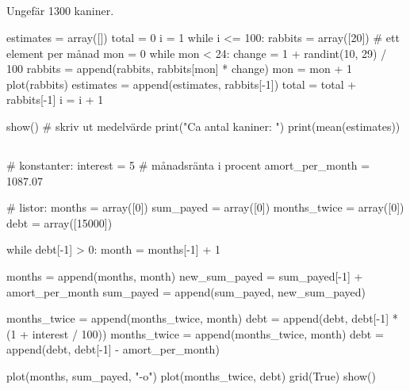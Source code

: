 

\newpage
\subsection*{}
Ungefär 1300 kaniner.
\vspace{10pt}
\begin{python}
estimates = array([])
total = 0
i = 1
while i <= 100:
	rabbits = array([20]) # ett element per månad
	mon = 0
	while mon < 24:
		change = 1 + randint(10, 29) / 100
		rabbits = append(rabbits, rabbits[mon] * change)
		mon = mon + 1
	plot(rabbits)
	estimates = append(estimates, rabbits[-1])
	total = total + rabbits[-1]
	i = i + 1

show()
# skriv ut medelvärde
print("Ca antal kaniner: ")
print(mean(estimates))
\end{python}


\subsection*{}
\vspace{3pt}
\begin{python}
# konstanter:
interest = 5 # månadsränta i procent
amort_per_month = 1087.07

# listor:
months = array([0])
sum_payed = array([0])
months_twice = array([0])
debt = array([15000])

while debt[-1] > 0:
  month = months[-1] + 1

  months = append(months, month)
  new_sum_payed = sum_payed[-1] + amort_per_month
  sum_payed = append(sum_payed, new_sum_payed)

  months_twice = append(months_twice, month)
  debt = append(debt, debt[-1] * (1 + interest / 100))
  months_twice = append(months_twice, month)
  debt = append(debt, debt[-1] - amort_per_month)

plot(months, sum_payed, "-o")
plot(months_twice, debt)
grid(True)
show()
\end{python}

